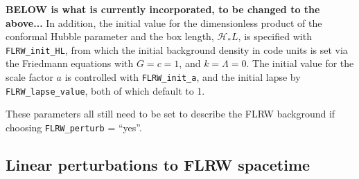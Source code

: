 \vspace{2mm}
{\bf BELOW is what is currently incorporated, to be changed to the above...}
\vspace{2mm}
In addition, the initial value for the dimensionless product of the conformal Hubble parameter and the box length, $\mathcal{H}_* L$, is specified with \texttt{FLRW\_init\_HL}, from which the initial background density in code units is set via the Friedmann equations with $G=c=1$, and $k=\Lambda=0$. The initial value for the scale factor $a$ is controlled with \texttt{FLRW\_init\_a}, and the initial lapse by \texttt{FLRW\_lapse\_value}, both of which default to 1. 

These parameters all still need to be set to describe the FLRW background if choosing \texttt{FLRW\_perturb} = ``yes''.

\subsection{Linear perturbations to FLRW spacetime}

